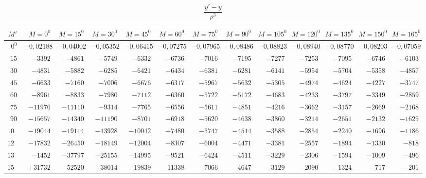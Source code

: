 \clearpage
\begin{landscape}
\begingroup
\scriptsize
\setlength{\tabcolsep}{2pt}
\renewcommand{\arraystretch}{1.12}
\[\frac{y'-y}{\rho^3}\]
\begin{center}
\begin{tabular}{@{}r|*{11}{r|}r@{}}
\hline
\(M'\) & \(M=0^0\) & \(M=15^0\) & \(M=30^0\) & \(M=45^0\) & \(M=60^0\) & \(M=75^0\) & \(M=90^0\) & \(M=105^0\) & \(M=120^0\) & \(M=135^0\) & \(M=150^0\) & \(M=165^0\)\\
\hline
\(0^0\) & \(-0{,}02188\) & \(-0{,}04002\) & \(-0{,}05352\) & \(-0{,}06415\) & \(-0{,}07275\) & \(-0{,}07965\) & \(-0{,}08486\) & \(-0{,}08823\) & \(-0{,}08940\) & \(-0{,}08770\) & \(-0{,}08203\) & \(-0{,}07059\)\\
\(15\) & \(-3392\) & \(-4861\) & \(-5749\) & \(-6332\) & \(-6736\) & \(-7016\) & \(-7195\) & \(-7277\) & \(-7253\) & \(-7095\) & \(-6746\) & \(-6103\)\\
\(30\) & \(-4831\) & \(-5882\) & \(-6285\) & \(-6421\) & \(-6434\) & \(-6381\) & \(-6281\) & \(-6141\) & \(-5954\) & \(-5704\) & \(-5358\) & \(-4857\)\\
\(45\) & \(-6633\) & \(-7160\) & \(-7006\) & \(-6676\) & \(-6317\) & \(-5967\) & \(-5632\) & \(-5305\) & \(-4974\) & \(-4624\) & \(-4227\) & \(-3747\)\\
\(60\) & \(-8961\) & \(-8833\) & \(-7980\) & \(-7112\) & \(-6360\) & \(-5722\) & \(-5172\) & \(-4683\) & \(-4233\) & \(-3797\) & \(-3349\) & \(-2859\)\\
\(75\) & \(-11976\) & \(-11110\) & \(-9314\) & \(-7765\) & \(-6556\) & \(-5611\) & \(-4851\) & \(-4216\) & \(-3662\) & \(-3157\) & \(-2669\) & \(-2168\)\\
\(90\) & \(-15657\) & \(-14340\) & \(-11190\) & \(-8701\) & \(-6918\) & \(-5620\) & \(-4638\) & \(-3860\) & \(-3214\) & \(-2651\) & \(-2132\) & \(-1625\)\\
\(105\) & \(-19044\) & \(-19114\) & \(-13928\) & \(-10042\) & \(-7480\) & \(-5747\) & \(-4514\) & \(-3588\) & \(-2854\) & \(-2240\) & \(-1696\) & \(-1186\)\\
\(120\) & \(-17832\) & \(-26450\) & \(-18149\) & \(-12004\) & \(-8307\) & \(-6004\) & \(-4471\) & \(-3381\) & \(-2557\) & \(-1894\) & \(-1330\) & \(-818\)\\
\(135\) & \(-1452\) & \(-37797\) & \(-25155\) & \(-14995\) & \(-9521\) & \(-6424\) & \(-4511\) & \(-3229\) & \(-2306\) & \(-1594\) & \(-1009\) & \(-496\)\\
\(150\) & \(+31732\) & \(-52520\) & \(-38014\) & \(-19839\) & \(-11338\) & \(-7066\) & \(-4647\) & \(-3129\) & \(-2090\) & \(-1324\) & \(-717\) & \(-201\)\\

\end{tabular}
\end{center}
\end{landscape}

